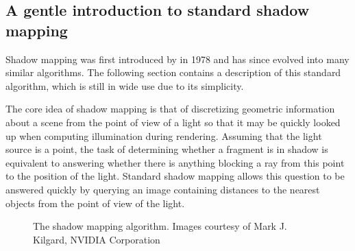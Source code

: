 \subsection{A gentle introduction to standard shadow mapping}

Shadow mapping was first introduced by \citet{Williams78castingcurved} in 1978 and has since evolved into many similar algorithms. The following section contains a description of this standard algorithm, which is still in wide use due to its simplicity.

The core idea of shadow mapping is that of discretizing geometric information about a scene from the point of view of a light so that it may be quickly looked up when computing illumination during rendering. Assuming that the light source is a point, the task of determining whether a fragment is in shadow is equivalent to answering whether there is anything blocking a ray from this point to the position of the light. Standard shadow mapping allows this question to be answered quickly by querying an image containing distances to the nearest objects from the point of view of the light.

\begin{figure}[ht!]
  \centering
  \caption{The shadow mapping algorithm. Images courtesy of Mark J. Kilgard, NVIDIA Corporation}
  \label{fig:ShadowMappingAlgorithm}
\end{figure}

